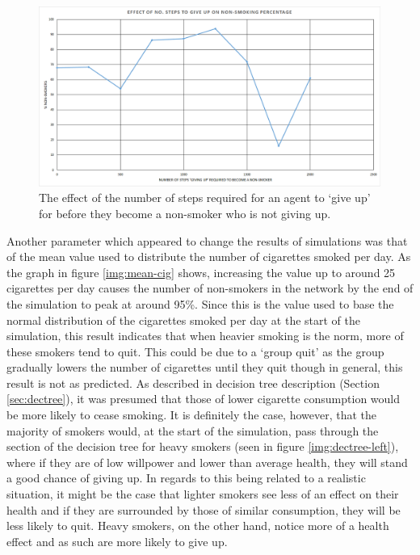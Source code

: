 \documentclass[]{report}
\begin{document}
\begin{figure}
\begin{center}
\includegraphics[width=\textwidth]{give-up.png}
\end{center}
\caption{The effect of the number of steps required for an agent to `give up' for before they become a non-smoker who is not giving up.}
\label{img:give-up}
\end{figure}

Another parameter which appeared to change the results of simulations was that of the mean value used to distribute the number of cigarettes smoked per day. As the graph in figure \ref{img:mean-cig} shows, increasing the value up to around 25 cigarettes per day causes the number of non-smokers in the network by the end of the simulation to peak at around 95\%. Since this is the value used to base the normal distribution of the cigarettes smoked per day at the start of the simulation, this result indicates that when heavier smoking is the norm, more of these smokers tend to quit. This could be due to a `group quit' as the group gradually lowers the number of cigarettes until they quit though in general, this result is not as predicted. As described in decision tree description (Section \ref{sec:dectree}), it was presumed that those of lower cigarette consumption would be more likely to cease smoking. It is definitely the case, however, that the majority of smokers would, at the start of the simulation, pass through the section of the decision tree for heavy smokers (seen in figure \ref{img:dectree-left}), where if they are of low willpower and lower than average health, they will stand a good chance of giving up. In regards to this being related to a realistic situation, it might be the case that lighter smokers see less of an effect on their health and if they are surrounded by those of similar consumption, they will be less likely to quit. Heavy smokers, on the other hand, notice more of a health effect and as such are more likely to give up.
\end{document}
